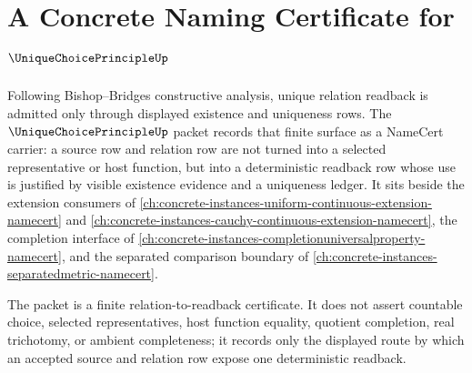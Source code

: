 \chapter{A Concrete Naming Certificate for $\UniqueChoicePrincipleUp$}
\label{ch:concrete-instances-unique-choice-principle-namecert}

Following Bishop--Bridges constructive analysis, unique relation readback is admitted only through displayed existence and uniqueness rows. The $\UniqueChoicePrincipleUp$ packet records that finite surface as a NameCert carrier: a source row and relation row are not turned into a selected representative or host function, but into a deterministic readback row whose use is justified by visible existence evidence and a uniqueness ledger. It sits beside the extension consumers of \autoref{ch:concrete-instances-uniform-continuous-extension-namecert} and \autoref{ch:concrete-instances-cauchy-continuous-extension-namecert}, the completion interface of \autoref{ch:concrete-instances-completionuniversalproperty-namecert}, and the separated comparison boundary of \autoref{ch:concrete-instances-separatedmetric-namecert}.

The packet is a finite relation-to-readback certificate. It does not assert countable choice, selected representatives, host function equality, quotient completion, real trichotomy, or ambient completeness; it records only the displayed route by which an accepted source and relation row expose one deterministic readback.

